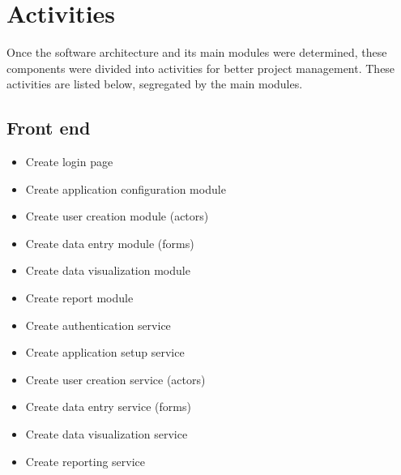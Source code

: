 \section{Activities}{} %

Once the software architecture and its main modules were determined, these components were divided into activities for better project management. These activities are listed below, segregated by the main modules.

\subsection{Front end}\label{sec:FrontendActivities}
\begin{itemize}
\item Create login page
\item Create application configuration module
\item Create user creation module (actors)
\item Create data entry module (forms)
\item Create data visualization module
\item Create report module
\item Create authentication service
\item Create application setup service
\item Create user creation service (actors)
\item Create data entry service (forms)
\item Create data visualization service
\item Create reporting service
\end{itemize}

